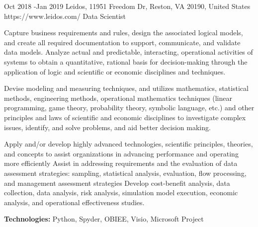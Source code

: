 \documentclass[10pt]{article} %
\begin{document}
\job
{Oct 2018 -}{Jan 2019}
{Leidos, 11951 Freedom Dr, Reston, VA 20190, United States}
{https://www.leidos.com/}
{Data Scientist}
{Capture business requirements and rules, design the associated logical models, and create all required documentation to support, communicate, and validate data models. Analyze actual and predictable, interacting, operational activities of systems to obtain a quantitative, rational basis for decision-making through the application of logic and scientific or economic disciplines and techniques. 

Devise modeling and measuring techniques, and utilizes mathematics, statistical methods, engineering methods, operational mathematics techniques (linear programming, game theory, probability theory, symbolic language, etc.) and other principles and laws of scientific and economic disciplines to investigate complex issues, identify, and solve problems, and aid better decision making.

Apply and/or develop highly advanced technologies, scientific principles, theories, and concepts to assist organizations in advancing performance and operating more efficiently Assist in addressing requirements and the evaluation of data assessment strategies: sampling, statistical analysis, evaluation, flow processing, and management assessment strategies Develop cost-benefit analysis, data collection, data analysis, risk analysis, simulation model execution, economic analysis, and operational effectiveness studies. \\
\rule{0mm}{5mm}\textbf{Technologies:} Python, Spyder, OBIEE, Visio, Microsoft Project}

\end{document}
